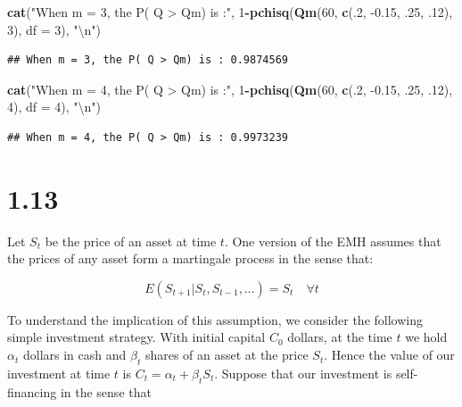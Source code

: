 \documentclass[11pt,]{article}
\newenvironment{Shaded}{\begin{snugshade}}{\end{snugshade}}
\newcommand{\CharTok}[1]{\textcolor[rgb]{0.31,0.60,0.02}{#1}}
\newcommand{\DataTypeTok}[1]{\textcolor[rgb]{0.13,0.29,0.53}{#1}}
\newcommand{\DecValTok}[1]{\textcolor[rgb]{0.00,0.00,0.81}{#1}}
\newcommand{\FloatTok}[1]{\textcolor[rgb]{0.00,0.00,0.81}{#1}}
\newcommand{\KeywordTok}[1]{\textcolor[rgb]{0.13,0.29,0.53}{\textbf{#1}}}
\newcommand{\NormalTok}[1]{#1}
\newcommand{\OperatorTok}[1]{\textcolor[rgb]{0.81,0.36,0.00}{\textbf{#1}}}
\newcommand{\StringTok}[1]{\textcolor[rgb]{0.31,0.60,0.02}{#1}}
\begin{document}
\begin{Shaded}
\begin{Highlighting}[]
\KeywordTok{cat}\NormalTok{(}\StringTok{"When m = 3, the P( Q > Qm) is :"}\NormalTok{, }
    \DecValTok{1}\OperatorTok{-}\KeywordTok{pchisq}\NormalTok{(}\KeywordTok{Qm}\NormalTok{(}\DecValTok{60}\NormalTok{, }\KeywordTok{c}\NormalTok{(.}\DecValTok{2}\NormalTok{, }\FloatTok{-0.15}\NormalTok{, }\FloatTok{.25}\NormalTok{, }\FloatTok{.12}\NormalTok{), }\DecValTok{3}\NormalTok{), }\DataTypeTok{df =} \DecValTok{3}\NormalTok{), }\StringTok{"}\CharTok{\textbackslash{}n}\StringTok{"}\NormalTok{)}
\end{Highlighting}
\end{Shaded}

\begin{verbatim}
## When m = 3, the P( Q > Qm) is : 0.9874569
\end{verbatim}

\begin{Shaded}
\begin{Highlighting}[]
\KeywordTok{cat}\NormalTok{(}\StringTok{"When m = 4, the P( Q > Qm) is :"}\NormalTok{, }
    \DecValTok{1}\OperatorTok{-}\KeywordTok{pchisq}\NormalTok{(}\KeywordTok{Qm}\NormalTok{(}\DecValTok{60}\NormalTok{, }\KeywordTok{c}\NormalTok{(.}\DecValTok{2}\NormalTok{, }\FloatTok{-0.15}\NormalTok{, }\FloatTok{.25}\NormalTok{, }\FloatTok{.12}\NormalTok{), }\DecValTok{4}\NormalTok{), }\DataTypeTok{df =} \DecValTok{4}\NormalTok{), }\StringTok{"}\CharTok{\textbackslash{}n}\StringTok{"}\NormalTok{)}
\end{Highlighting}
\end{Shaded}

\begin{verbatim}
## When m = 4, the P( Q > Qm) is : 0.9973239
\end{verbatim}

\hypertarget{section-4}{%
\section{1.13}\label{section-4}}

Let \(S_t\) be the price of an asset at time \(t\). One version of the
EMH assumes that the prices of any asset form a martingale process in
the sense that:

\[
E(S_{t+1}|S_t, S_{t-1}, \ldots ) = S_t \quad \forall t
\]

To understand the implication of this assumption, we consider the
following simple investment strategy. With initial capital \(C_0\)
dollars, at the time \(t\) we hold \(\alpha_t\) dollars in cash and
\(\beta_t\) shares of an asset at the price \(S_t\). Hence the value of
our investment at time \(t\) is \(C_t=\alpha_t + \beta_t S_t\). Suppose
that our investment is self-financing in the sense that
\end{document}

